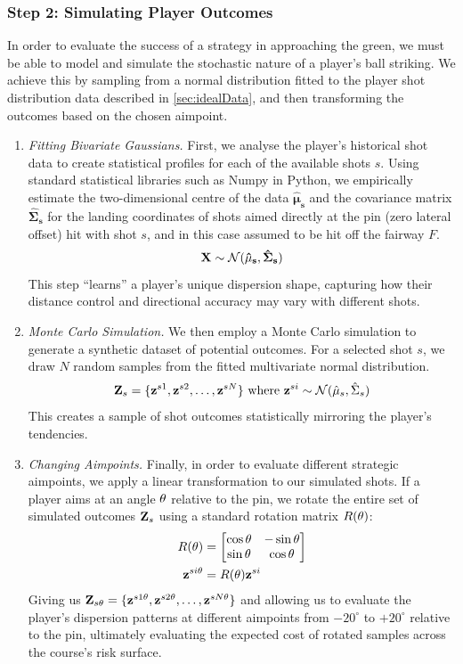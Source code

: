 \documentclass[11pt, letterpaper]{article}
\begin{document}
\subsubsection{Step 2: Simulating Player Outcomes}
\label{subsec: playerSim}
In order to evaluate the success of a strategy in approaching the green, we must be able to model and simulate the stochastic nature of a player's ball striking. We achieve this by sampling from a normal distribution fitted to the player shot distribution data described in \ref{sec:idealData}, and then transforming the outcomes based on the chosen aimpoint.

\begin{enumerate}
    \item \textit{Fitting Bivariate Gaussians.} First, we analyse the player's historical shot data to create statistical profiles for each of the available shots $s$. Using standard statistical libraries such as \parencite{numpy} Numpy in Python, we empirically estimate the two-dimensional centre of the data $\mathbf{\hat\mu_s}$ and the covariance matrix $\mathbf{\hat\Sigma_s}$ for the landing coordinates of shots aimed directly at the pin (zero lateral offset) hit with shot $s$, and in this case assumed to be hit off the fairway $F$. 
     \[\mathbf{X} \sim \mathcal{N}(\mathbf{\hat\mu_s}, \mathbf{\hat\Sigma_s})\]   
    This step ``learns'' a player's unique dispersion shape, capturing how their distance control and directional accuracy may vary with different shots.

     \item \textit{Monte Carlo Simulation.} We then employ a Monte Carlo simulation to generate a synthetic dataset of potential outcomes. For a selected shot $s$, we draw $N$ random samples from the fitted multivariate normal distribution. 
     $$\mathbf{Z}_s = \{\mathbf{z}^{s1}, \mathbf{z}^{s2}, \ldots, \mathbf{z}^{sN}\} \text{ where } \mathbf{z}^{si} \sim \mathcal{N}(\hat\mu_s, \hat\Sigma_s)$$
     This creates a sample of shot outcomes statistically mirroring the player's tendencies.

     \item \textit{Changing Aimpoints.} Finally, in order to evaluate different strategic aimpoints, we apply a linear transformation to our simulated shots. If a player aims at an angle $\theta$ relative to the pin, we rotate the entire set of simulated outcomes $\mathbf{Z}_s$ using a standard rotation matrix $R(\theta)$: 
     \begin{align*}
         R(\theta) &= \begin{bmatrix}
             \cos \theta & - \sin \theta \\
             \sin \theta & \cos \theta
         \end{bmatrix} \\
         \mathbf{z}^{si\theta} &= R(\theta)\mathbf{z}^{si}
     \end{align*}
     Giving us $\mathbf{Z}_{s\theta} =  \{\mathbf{z}^{s1\theta}, \mathbf{z}^{s2\theta}, \ldots, \mathbf{z}^{sN\theta}\}$ and allowing us to evaluate the player's dispersion patterns at different aimpoints from $-20 ^\circ$ to $+20 ^\circ$ relative to the pin, ultimately evaluating the expected cost of rotated samples across the course's risk surface.
\end{enumerate}
\end{document}
